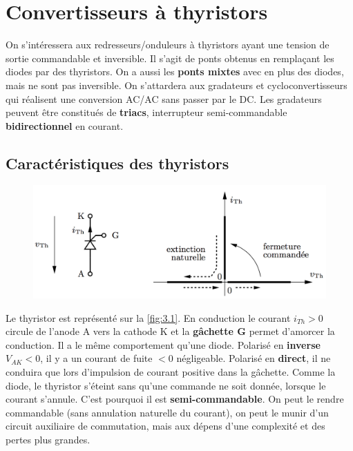 
\chapter{Convertisseurs à thyristors}
	On s'intéressera aux redresseurs/onduleurs à thyristors ayant une tension de sortie commandable et inversible. Il s'agit de ponts obtenus en remplaçant les diodes par des thyristors. On a aussi les \textbf{ponts mixtes} avec en plus des diodes, mais ne sont pas inversible. On s'attardera aux gradateurs et cycloconvertisseurs qui réalisent une conversion AC/AC sans passer par le DC. Les gradateurs peuvent être constitués de \textbf{triacs}, interrupteur semi-commandable \textbf{bidirectionnel} en courant. 
	
	\section{Caractéristiques des thyristors}
		\begin{figure}
		\vspace{-5mm}
		\includegraphics[scale=0.3]{ch3/1}
		\label{fig:3.1}
		\end{figure}
		Le thyristor est représenté sur la \autoref{fig:3.1}. En conduction le courant $i_{Th} > 0$ circule de l'anode A vers la cathode K et la \textbf{gâchette G} permet d'amorcer la conduction. Il a le même comportement qu'une diode. Polarisé en \textbf{inverse} $V_{AK}<0$, il y a un courant de fuite $<0$ négligeable. Polarisé en \textbf{direct}, il ne conduira que lors d'impulsion de courant positive dans la gâchette. Comme la diode, le thyristor s'éteint sans qu'une commande ne soit donnée, lorsque le courant s'annule. C'est pourquoi il est \textbf{semi-commandable}. On peut le rendre commandable (sans annulation naturelle du courant), on peut le munir d'un circuit auxiliaire de commutation, mais aux dépens d'une complexité et des pertes plus grandes. \\
		
